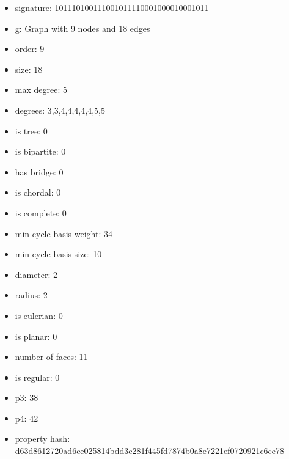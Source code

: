 \newpage
\begin{figure}
\end{figure}
\begin{itemize}
\item signature: 101110100111001011110001000010001011
\item g: Graph with 9 nodes and 18 edges
\item order: 9
\item size: 18
\item max degree: 5
\item degrees: 3,3,4,4,4,4,4,5,5
\item is tree: 0
\item is bipartite: 0
\item has bridge: 0
\item is chordal: 0
\item is complete: 0
\item min cycle basis weight: 34
\item min cycle basis size: 10
\item diameter: 2
\item radius: 2
\item is eulerian: 0
\item is planar: 0
\item number of faces: 11
\item is regular: 0
\item p3: 38
\item p4: 42
\item property hash: d63d8612720ad6ce025814bdd3c281f445fd7874b0a8e7221ef0720921c6ce78
\end{itemize}
